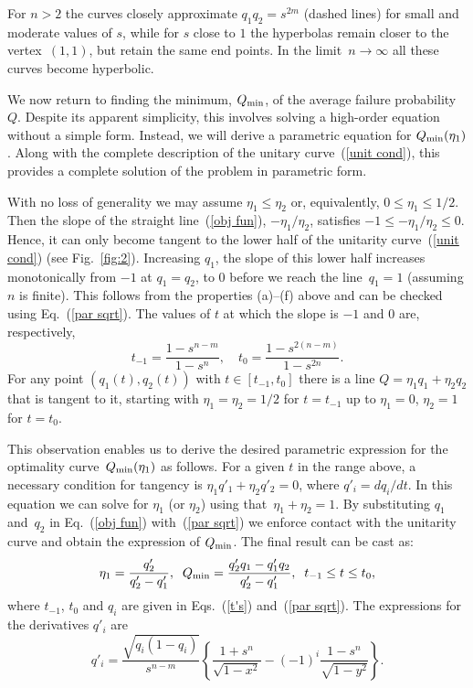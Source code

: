 \documentclass[aps,prl,twocolumn,showpacs]{revtex4}
\begin{document}
For $n > 2$ the curves closely approximate $q_1 q_2=s^{2m}$ (dashed lines) for small and moderate values of $s$, while for $s$ close to $1$ the hyperbolas remain closer to the vertex~$(1,1)$, but retain the same end points. In the limit~$n\to\infty$ all these curves become hyperbolic.

We now return to finding the minimum, $Q_{\rm min}$, of the average failure probability $Q$. Despite its apparent simplicity, this involves solving a high-order equation without a simple form. Instead, we will derive a parametric equation for $Q_{\rm min}(\eta_1)$. Along with the complete description of the unitary curve~(\ref{unit cond}), this provides a complete solution of the problem in parametric form.

With no loss of generality we may assume $\eta_1\le\eta_2$ or, equivalently,  $0\le\eta_1\le 1/2$. Then the slope of the straight line~(\ref{obj fun}), $-\eta_{1}/ \eta_{2}$, satisfies $-1\leq -\eta_{1}/\eta_{2} \leq0$. Hence, it can only become tangent to the lower half of the unitarity curve~(\ref{unit cond}) (see Fig.~\ref{fig:2}). 
Increasing $q_{1}$, the slope of this lower half increases monotonically from $-1$ at $q_1=q_2$, to $0$ before we reach the line~$q_1=1$ (assuming $n$ is finite). This follows from the properties (a)--(f) above and can be checked using  Eq.~(\ref{par sqrt}). The values of $t$ at which the slope is $-1$ and $0$ are, respectively,
%
\begin{equation}
t_{-1}=\frac{1-s^{n-m}}{1-s^n},\quad
t_0=\frac{1-s^{2(n-m)}}{1-s^{2n}}.
\label{t's}
\end{equation}
%
For any point $(q_1(t),q_2(t))$ with $t\in[t_{-1},t_0]$ there is a line $Q=\eta_1 q_1+\eta_2 q_2$ that is tangent to it, starting with $\eta_1=\eta_2=1/2$ for $t=t_{-1}$ up to $\eta_1=0$, $\eta_2=1$ for $t=t_0$. 

This observation enables us to derive the desired parametric expression for the optimality curve~$Q_{\rm min}(\eta_1)$ as follows. For a given $t$ in the range above, a necessary condition for tangency is \mbox{$\eta_1 q'_1+\eta_2 q'_2=0$}, where $q'_i=d q_i/d t$. In this equation we can solve for $\eta_1$ (or $\eta_2$) using that~$\eta_1+\eta_2=1$. By substituting $q_1$ and~$q_2$ in Eq.~(\ref{obj fun}) with~(\ref{par sqrt}) we enforce contact with the unitarity curve and obtain the expression of $Q_{\rm min}$. The final result can be cast as:
%
\begin{equation}
\eta_1=\frac{q'_2}{q'_2-q'_1},\;\; Q_{\rm min}=\frac{q'_2 q_1-q'_1 q_2}{q'_2-q'_1},\;\; t_{-1}\le t\le t_0,
\label{main}
\end{equation}
%
where $t_{-1}$, $t_0$ and $q_i$ are given in Eqs.~(\ref{t's}) and~(\ref{par sqrt}). The expressions for the derivatives $q'_i$ are
%
\begin{equation}
q'_i=\frac{\sqrt{q_i(1-q_i)}}{s^{n-m}}\left\{\frac{1+s^n}{\sqrt{1-x^2}}-(-1)^i\frac{1-s^n}{\sqrt{1-y^2}}\right\}.
\label{qi'}
\end{equation}
%
\end{document}
